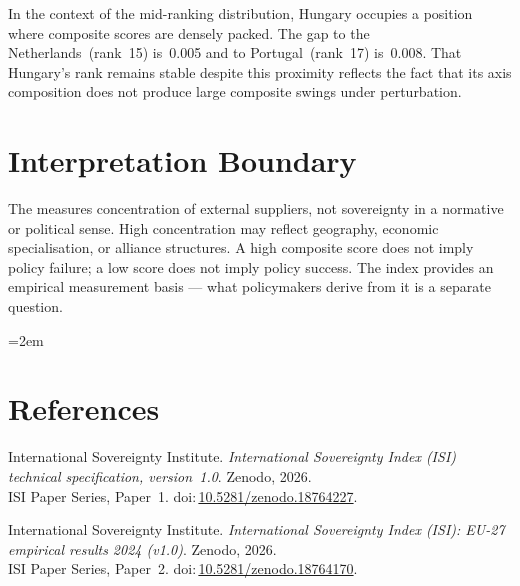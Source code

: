 \documentclass[12pt,a4paper]{article}
\begin{document}
In the context of the mid-ranking distribution, Hungary occupies a position where composite scores are densely packed.  The gap to the Netherlands~(rank~15) is~0.005 and to Portugal~(rank~17) is~0.008.  That Hungary's rank remains stable despite this proximity reflects the fact that its axis composition does not produce large composite swings under perturbation.


\section{Interpretation Boundary}
\label{sec:interpretation}

The \ISI measures concentration of external suppliers, not sovereignty in a normative or political sense.  High concentration may reflect geography, economic specialisation, or alliance structures.  A high composite score does not imply policy failure; a low score does not imply policy success.  The index provides an empirical measurement basis --- what policymakers derive from it is a separate question.


\clearpage
\vspace*{1.5cm}

\begingroup\emergencystretch=2em
\section*{References}

\begin{enumerate}[label={[\arabic*]},leftmargin=2em,itemsep=6pt]
\item International Sovereignty Institute.
  \textit{International Sovereignty Index (ISI) technical specification, version~1.0}.
  Zenodo, 2026.\\ISI Paper Series, Paper~1.
  doi:\,\href{https://doi.org/10.5281/zenodo.18764227}{10.5281/zenodo.18764227}.

\item International Sovereignty Institute.
  \textit{International Sovereignty Index (ISI): EU-27 empirical results 2024 (v1.0)}.
  Zenodo, 2026.\\ISI Paper Series, Paper~2.
  doi:\,\href{https://doi.org/10.5281/zenodo.18764170}{10.5281/zenodo.18764170}.
\end{enumerate}
\endgroup
\end{document}
